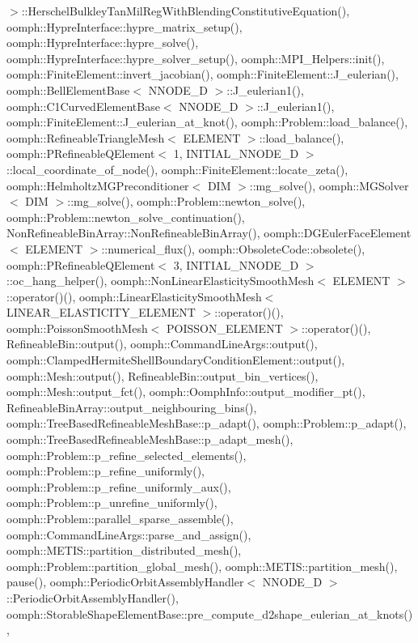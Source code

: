 $>$\+::\+Herschel\+Bulkley\+Tan\+Mil\+Reg\+With\+Blending\+Constitutive\+Equation(), oomph\+::\+Hypre\+Interface\+::hypre\+\_\+matrix\+\_\+setup(), oomph\+::\+Hypre\+Interface\+::hypre\+\_\+solve(), oomph\+::\+Hypre\+Interface\+::hypre\+\_\+solver\+\_\+setup(), oomph\+::\+M\+P\+I\+\_\+\+Helpers\+::init(), oomph\+::\+Finite\+Element\+::invert\+\_\+jacobian(), oomph\+::\+Finite\+Element\+::\+J\+\_\+eulerian(), oomph\+::\+Bell\+Element\+Base$<$ N\+N\+O\+D\+E\+\_\+D $>$\+::\+J\+\_\+eulerian1(), oomph\+::\+C1\+Curved\+Element\+Base$<$ N\+N\+O\+D\+E\+\_\+D $>$\+::\+J\+\_\+eulerian1(), oomph\+::\+Finite\+Element\+::\+J\+\_\+eulerian\+\_\+at\+\_\+knot(), oomph\+::\+Problem\+::load\+\_\+balance(), oomph\+::\+Refineable\+Triangle\+Mesh$<$ E\+L\+E\+M\+E\+N\+T $>$\+::load\+\_\+balance(), oomph\+::\+P\+Refineable\+Q\+Element$<$ 1, I\+N\+I\+T\+I\+A\+L\+\_\+\+N\+N\+O\+D\+E\+\_\+D $>$\+::local\+\_\+coordinate\+\_\+of\+\_\+node(), oomph\+::\+Finite\+Element\+::locate\+\_\+zeta(), oomph\+::\+Helmholtz\+M\+G\+Preconditioner$<$ D\+I\+M $>$\+::mg\+\_\+solve(), oomph\+::\+M\+G\+Solver$<$ D\+I\+M $>$\+::mg\+\_\+solve(), oomph\+::\+Problem\+::newton\+\_\+solve(), oomph\+::\+Problem\+::newton\+\_\+solve\+\_\+continuation(), Non\+Refineable\+Bin\+Array\+::\+Non\+Refineable\+Bin\+Array(), oomph\+::\+D\+G\+Euler\+Face\+Element$<$ E\+L\+E\+M\+E\+N\+T $>$\+::numerical\+\_\+flux(), oomph\+::\+Obsolete\+Code\+::obsolete(), oomph\+::\+P\+Refineable\+Q\+Element$<$ 3, I\+N\+I\+T\+I\+A\+L\+\_\+\+N\+N\+O\+D\+E\+\_\+D $>$\+::oc\+\_\+hang\+\_\+helper(), oomph\+::\+Non\+Linear\+Elasticity\+Smooth\+Mesh$<$ E\+L\+E\+M\+E\+N\+T $>$\+::operator()(), oomph\+::\+Linear\+Elasticity\+Smooth\+Mesh$<$ L\+I\+N\+E\+A\+R\+\_\+\+E\+L\+A\+S\+T\+I\+C\+I\+T\+Y\+\_\+\+E\+L\+E\+M\+E\+N\+T $>$\+::operator()(), oomph\+::\+Poisson\+Smooth\+Mesh$<$ P\+O\+I\+S\+S\+O\+N\+\_\+\+E\+L\+E\+M\+E\+N\+T $>$\+::operator()(), Refineable\+Bin\+::output(), oomph\+::\+Command\+Line\+Args\+::output(), oomph\+::\+Clamped\+Hermite\+Shell\+Boundary\+Condition\+Element\+::output(), oomph\+::\+Mesh\+::output(), Refineable\+Bin\+::output\+\_\+bin\+\_\+vertices(), oomph\+::\+Mesh\+::output\+\_\+fct(), oomph\+::\+Oomph\+Info\+::output\+\_\+modifier\+\_\+pt(), Refineable\+Bin\+Array\+::output\+\_\+neighbouring\+\_\+bins(), oomph\+::\+Tree\+Based\+Refineable\+Mesh\+Base\+::p\+\_\+adapt(), oomph\+::\+Problem\+::p\+\_\+adapt(), oomph\+::\+Tree\+Based\+Refineable\+Mesh\+Base\+::p\+\_\+adapt\+\_\+mesh(), oomph\+::\+Problem\+::p\+\_\+refine\+\_\+selected\+\_\+elements(), oomph\+::\+Problem\+::p\+\_\+refine\+\_\+uniformly(), oomph\+::\+Problem\+::p\+\_\+refine\+\_\+uniformly\+\_\+aux(), oomph\+::\+Problem\+::p\+\_\+unrefine\+\_\+uniformly(), oomph\+::\+Problem\+::parallel\+\_\+sparse\+\_\+assemble(), oomph\+::\+Command\+Line\+Args\+::parse\+\_\+and\+\_\+assign(), oomph\+::\+M\+E\+T\+I\+S\+::partition\+\_\+distributed\+\_\+mesh(), oomph\+::\+Problem\+::partition\+\_\+global\+\_\+mesh(), oomph\+::\+M\+E\+T\+I\+S\+::partition\+\_\+mesh(), pause(), oomph\+::\+Periodic\+Orbit\+Assembly\+Handler$<$ N\+N\+O\+D\+E\+\_\+D $>$\+::\+Periodic\+Orbit\+Assembly\+Handler(), oomph\+::\+Storable\+Shape\+Element\+Base\+::pre\+\_\+compute\+\_\+d2shape\+\_\+eulerian\+\_\+at\+\_\+knots(), 